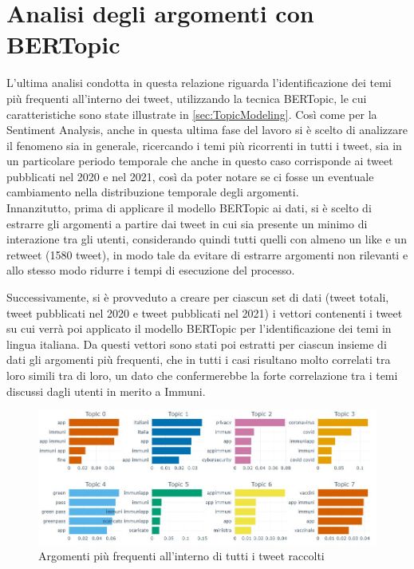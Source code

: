 \chapter{Analisi degli argomenti con BERTopic}

L'ultima analisi condotta in questa relazione riguarda l'identificazione dei temi più frequenti all'interno dei tweet, utilizzando la tecnica BERTopic, le cui caratteristiche sono state illustrate in \ref{sec:TopicModeling}.
Così come per la Sentiment Analysis, anche in questa ultima fase del lavoro si è scelto di analizzare il fenomeno sia in generale, ricercando i temi più ricorrenti in tutti i tweet, sia in un particolare periodo temporale che anche in questo caso corrisponde ai tweet pubblicati nel 2020 e nel 2021, così da poter notare se ci fosse un eventuale cambiamento nella distribuzione temporale degli argomenti.\\


Innanzitutto, prima di applicare il modello BERTopic ai dati, si è scelto di estrarre gli argomenti a partire dai tweet in cui sia presente un minimo di interazione tra gli utenti, considerando quindi tutti quelli con almeno un like e un retweet (1580 tweet), in modo tale da evitare di estrarre argomenti non rilevanti e allo stesso modo ridurre i tempi di esecuzione del processo. 

Successivamente, si è provveduto a creare per ciascun set di dati (tweet totali, tweet pubblicati nel 2020 e tweet pubblicati nel 2021) i vettori contenenti i tweet su cui verrà poi applicato il modello BERTopic per l'identificazione dei temi in lingua italiana.
Da questi vettori sono stati poi estratti per ciascun insieme di dati gli argomenti più frequenti, che in tutti i casi risultano molto correlati tra loro simili tra di loro, un dato che confermerebbe la forte correlazione tra i temi discussi dagli utenti in merito a Immuni.
\begin{figure} [H]
    \centering
    \includegraphics[width = 1\textwidth]{img/topics_tot.jpg}
    \caption{Argomenti più frequenti all'interno di tutti i tweet raccolti}
    \label{fig:topicMtot}
\end{figure}

